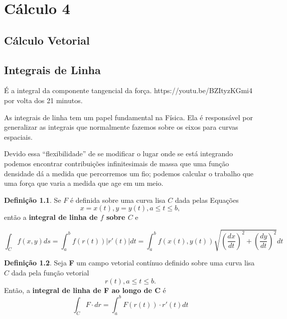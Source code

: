 \chapter{Cálculo 4}
\section{Cálculo Vetorial}


\section{Integrais de Linha}

É a integral da componente tangencial da força. 
https://youtu.be/BZItyzKGmi4 por volta dos 21 minutos.

As integrais de linha tem um papel fundamental na Física. Ela é responsável por generalizar as integrais que normalmente fazemos sobre os eixos para curvas espaciais.

Devido essa ``flexibilidade'' de se modificar o lugar onde se está integrando podemos encontrar contribuições infinitesimais de massa que uma função densidade dá a medida que percorremos um fio; podemos calcular o trabalho que uma força que varia a medida que age em um meio.



\theoremstyle{definition}
\newtheorem{defi}{Definição}

\begin{defi}%
Se $F$ é definida sobre uma curva lisa $C$ dada pelas Equações $$x=x(t), y=y(t), a\leq t\leq b,$$ então a \textbf{integral de linha de $f$ sobre $C$} e 

\begin{equation}\label{16.1}
\int_C f(x,y)ds =\int_a^b f(r(t)) |r'(t)|dt= \int_a^b f(x(t),y(t))\sqrt{\left( \dfrac{dx}{dt} \right)^2+\left( \dfrac{dy}{dt} \right)^2} dt
\end{equation}

\end{defi}




\begin{defi}%
Seja \textbf{F} um campo vetorial contínuo definido sobre uma curva lisa $C$ dada pela função vetorial $$r(t), a\leq t\leq b.$$ Então, a \textbf{integral de linha de F ao longo de C} é $$\int_C F \cdot dr = \int_a^b F(r(t))\cdot r'(t) dt$$
\end{defi}
